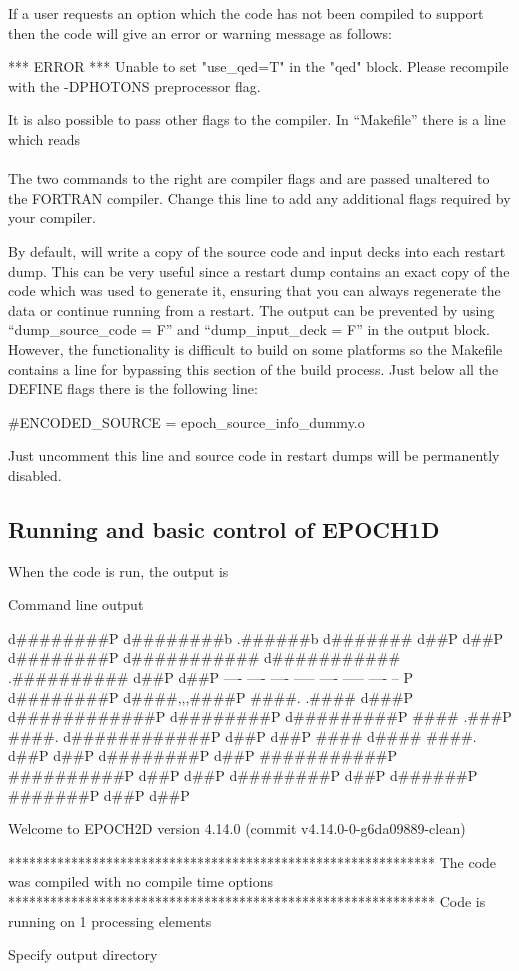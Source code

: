 If a user requests an option which the code has not been compiled to support
then the code will give an error or warning message as follows:
\begin{boxverbatim}
 *** ERROR ***
 Unable to set "use_qed=T" in the "qed" block.
 Please recompile with the -DPHOTONS preprocessor flag.
\end{boxverbatim}
It is also possible to pass other flags to the compiler. In ``Makefile'' there
is a line which reads\\
\indent{}\\
The two commands to the right are compiler flags and are passed unaltered to
the FORTRAN compiler. Change this line to add any additional flags required by
your compiler.

By default, {\EPOCH} will write a copy of the source code and input decks
into each restart dump. This can be very useful since a restart dump contains
an exact copy of the code which was used to generate it, ensuring that you
can always regenerate the data or continue running from a restart.
The output can be prevented by using ``dump\_source\_code = F'' and
``dump\_input\_deck = F'' in the output block.
However, the functionality is difficult to build on some platforms so
the Makefile contains a line for bypassing this section of the build
process. Just below all the DEFINE flags there is the following line:
\begin{boxverbatim}
#ENCODED_SOURCE = epoch_source_info_dummy.o
\end{boxverbatim}
Just uncomment this line and source code in restart dumps will be permanently
disabled.


\subsection{Running {\EPOCH} and basic control of EPOCH1D}
When the code is run, the output is
{\samepage
\begin{lboxverbatim}{Command line output}

        d########P  d########b        .######b          d#######  d##P      d##P
       d########P  d###########    d###########     .##########  d##P      d##P
      ----        ----     ----  -----     ----   -----         ----      -- P
     d########P  d####,,,####P ####.      .#### d###P          d############P
    d########P  d#########P   ####       .###P ####.          d############P
   d##P        d##P           ####     d####   ####.         d##P      d##P
  d########P  d##P            ###########P     ##########P  d##P      d##P
 d########P  d##P              d######P          #######P  d##P      d##P

 Welcome to EPOCH2D version 4.14.0   (commit v4.14.0-0-g6da09889-clean)

 *************************************************************
 The code was compiled with no compile time options
 *************************************************************
 Code is running on 1 processing elements

 Specify output directory
\end{lboxverbatim}
}

